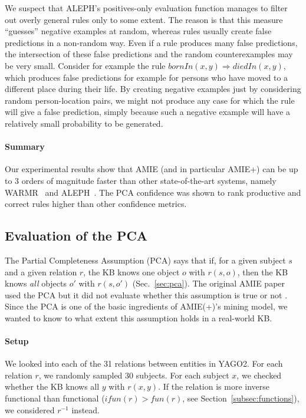 We suspect that ALEPH's positives-only evaluation function manages to filter out overly general rules only to some extent.
The reason is that this measure ``guesses'' negative examples at random, whereas rules usually create false predictions in a non-random way.
Even if a rule produces many false predictions, the intersection of these false predictions and the random counterexamples may be very small.
Consider for example the rule $bornIn(x,y) \Rightarrow diedIn(x,y)$, which produces false predictions for example for persons who have moved
to a different place during their life.
By creating negative examples just by considering random person-location pairs,
we might not produce any case for which the rule will give a false prediction,
simply because such a negative example will have a relatively small probability to be generated.

\paragraph{Summary}
Our experimental results show that AMIE (and in particular AMIE+) can be up to 3 orders of magnitude faster
than other state-of-the-art systems, namely WARMR~\cite{GoeVan02} and ALEPH~\cite{Muggleton:1996:LPD:647996.742465}.
The PCA confidence was shown to rank productive and correct rules higher than other confidence metrics.


\subsection{Evaluation of the PCA} \label{experimentspca}
The Partial Completeness Assumption (PCA) says that if, for a given subject $s$ and a given relation $r$, the KB knows one object $o$ with $r(s,o)$, then the KB knows \emph{all} objects $o'$ with $r(s,o')$ (Sec.~\ref{sec:pca}). The original AMIE paper used the PCA but it did not evaluate whether this assumption is true or not \cite{amie}.
Since the PCA is one of the basic ingredients of AMIE(+)'s mining model,
we wanted to know to what extent this assumption holds in a real-world KB.

\paragraph{Setup} We looked into each of the 31 relations between entities in YAGO2.
For each relation $r$, we randomly sampled 30 subjects.
For each subject $x$, we checked whether the KB knows all $y$ with $r(x,y)$. If the relation is more inverse functional than functional
($ifun(r) > fun(r)$, see Section~\ref{subsec:functions}), we considered $r^{-1}$ instead.

